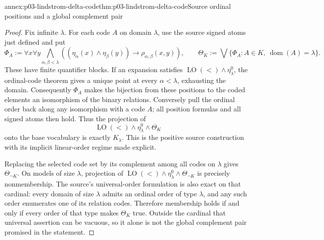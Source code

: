 \begin{annexitem}{annex:p03-lindstrom-delta-code}{thm:p03-lindstrom-delta-code}{Source ordinal positions and a global complement pair}
\begin{proof}
Fix infinite \(\lambda\). For each code \(A\) on domain
\(\lambda\), use the source signed atoms just defined and put
\[
 \Phi_A:=\forall x\forall y\bigwedge_{\alpha,\beta<\lambda}
 \left((\eta_\alpha(x)\land\eta_\beta(y))
                                      \to\rho_{\alpha,\beta}(x,y)\right),
 \qquad
 \Theta_K:=\bigvee\{\Phi_A:A\in K,\ \operatorname{dom}(A)=\lambda\}.
\]
These have finite quantifier blocks. If an expansion satisfies
\(\operatorname{LO}(<)\land\eta^0_\lambda\), the ordinal-code theorem
gives a unique point at every \(\alpha<\lambda\), exhausting the
domain. Consequently \(\Phi_A\) makes the bijection from these
positions to the coded elements an isomorphism of the binary relations.
Conversely pull the ordinal order back along any isomorphism with a
code \(A\); all position formulas and all signed atoms then hold.
Thus the projection of
\[
 \operatorname{LO}(<)\land\eta^0_\lambda\land\Theta_K
\]
onto the base vocabulary is exactly \(K_\lambda\). This is the
positive source construction with its implicit linear-order regime
made explicit.

Replacing the selected code set by its complement among all codes on
\(\lambda\) gives \(\Theta_{\neg K}\). On models of size
\(\lambda\), projection of
\(\operatorname{LO}(<)\land\eta^0_\lambda\land\Theta_{\neg K}\)
is precisely nonmembership. The source's universal-order formulation is
also exact on that cardinal: every domain of size \(\lambda\) admits
an ordinal order of type \(\lambda\), and any such order enumerates
one of its relation codes. Therefore membership holds if and only if
every order of that type makes \(\Theta_K\) true. Outside the cardinal
that universal assertion can be vacuous, so it alone is not the global
complement pair promised in the statement.


\end{proof}
\end{annexitem}
